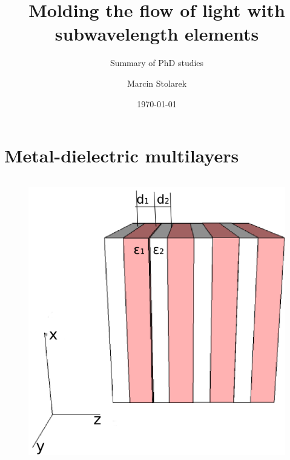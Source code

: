 \documentclass{beamer}
\title{Molding the flow of light with subwavelength elements}
\subtitle{Summary of PhD studies}
\author{Marcin Stolarek}
\institute{Information Optics Division, Faculty of Physics}
\date{\today}
\begin{document}
\renewcommand*{\bibfont}{\tiny}

\frame{\titlepage}

\frame{\tableofcontents}

\section{Metal-dielectric multilayers}
\begin{frame}
	\begin{columns}
		\begin{column}{0.5\textwidth}
			\begin{figure}[htb]
				\includegraphics[width=\textwidth]{../images/multilayer/multilayer-3d.png}\\
			

\end{figure}
\end{column}
\end{columns}
\end{frame}
\end{document}
